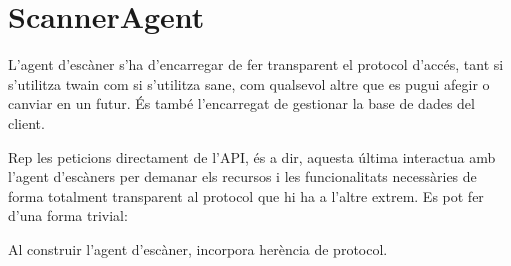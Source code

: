 \documentclass[letterpaper,11pt,catalan]{sphinxmanual}
\begin{document}
\section{ScannerAgent}
\label{\detokenize{index:scanneragent}}
L'agent d'escàner s'ha d'encarregar de fer transparent el protocol d'accés, tant si s'utilitza twain com si
s'utilitza sane, com qualsevol altre que es pugui afegir o canviar en un futur.
És també l'encarregat de gestionar la base de dades del client.

Rep les peticions directament de l'API, és a dir, aquesta última interactua amb
l'agent d'escàners per demanar els recursos i les funcionalitats necessàries de
forma totalment transparent al protocol que hi ha a l'altre extrem.
Es pot fer d'una forma trivial:

\begin{sphinxVerbatim}[commandchars=\\\{\}]
 

   

 
\end{sphinxVerbatim}

Al construir l'agent d'escàner, incorpora herència de protocol.
\end{document}
